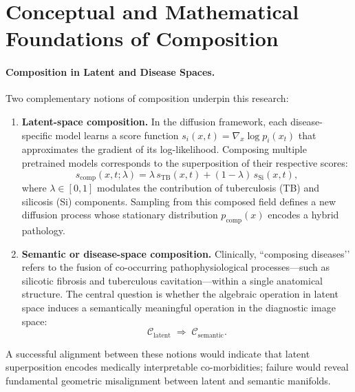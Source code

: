 \section{Conceptual and Mathematical Foundations of Composition}
\label{sec:composition_foundations}

\paragraph{Composition in Latent and Disease Spaces.}
Two complementary notions of composition underpin this research:

\begin{enumerate}[label=(\alph*)]
    \item \textbf{Latent-space composition.} In the diffusion framework, each disease-specific model learns a score function $s_i(x,t) = \nabla_x \log p_i(x_t)$ that approximates the gradient of its log-likelihood. Composing multiple pretrained models corresponds to the superposition of their respective scores:
    \[
        s_{\text{comp}}(x,t;\lambda) = \lambda\, s_{\mathrm{TB}}(x,t) + (1-\lambda)\, s_{\mathrm{Si}}(x,t),
    \]
    where $\lambda \in [0,1]$ modulates the contribution of tuberculosis (TB) and silicosis (Si) components. Sampling from this composed field defines a new diffusion process whose stationary distribution $p_{\text{comp}}(x)$ encodes a hybrid pathology.

    \item \textbf{Semantic or disease-space composition.} Clinically, “composing diseases’’ refers to the fusion of co-occurring pathophysiological processes—such as silicotic fibrosis and tuberculous cavitation—within a single anatomical structure. The central question is whether the algebraic operation in latent space induces a semantically meaningful operation in the diagnostic image space:
    \[
        \mathcal{C}_{\text{latent}} \;\Rightarrow\; \mathcal{C}_{\text{semantic}}.
    \]
\end{enumerate}

A successful alignment between these notions would indicate that latent superposition encodes medically interpretable co-morbidities; failure would reveal fundamental geometric misalignment between latent and semantic manifolds.


